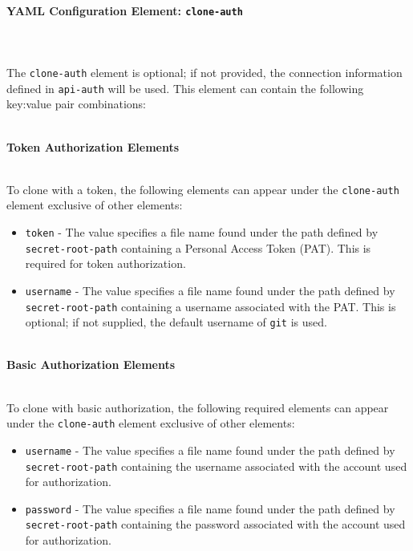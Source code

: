 \pagebreak
\paragraph{YAML Configuration Element: \texttt{clone-auth} }\label{sec:clone-auth-element}

\noindent\\\\The \texttt{clone-auth} element is optional;  if not provided, the connection information defined
in \texttt{api-auth} will be used.  This element can contain the following key:value pair combinations:

\noindent\\\textbf{Token Authorization Elements}

\noindent\\To clone with a token, the following elements can appear under the \texttt{clone-auth}
element exclusive of other elements:

\begin{itemize}
    \item \texttt{token} - The value specifies a file name found under the path defined
    by \texttt{secret-root-path} containing a Personal Access Token (PAT).  This is required for
    token authorization.
    \item \texttt{username} - The value specifies a file name found under the path defined
    by \texttt{secret-root-path} containing a username associated with the PAT.  This is 
    optional; if not supplied, the default username of \texttt{git} is used.
\end{itemize}

\noindent\\\textbf{Basic Authorization Elements}

\noindent\\To clone with basic authorization, the following required elements can appear under the
\texttt{clone-auth} element exclusive of other elements:

\begin{itemize}
    \item \texttt{username} - The value specifies a file name found under the path defined
    by \texttt{secret-root-path} containing the username associated with the account used
    for authorization. 
    \item \texttt{password} - The value specifies a file name found under the path defined
    by \texttt{secret-root-path} containing the password associated with the account used
    for authorization. 
\end{itemize}

